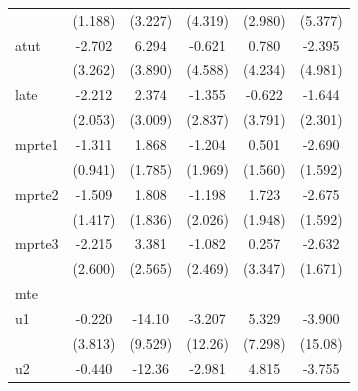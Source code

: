\begin{table}[htbp]
\begin{tabular}{l*{5}{c}}
                    &     (1.188)         &     (3.227)         &     (4.319)         &     (2.980)         &     (5.377)         \\
\addlinespace
atut                &      -2.702         &       6.294         &      -0.621         &       0.780         &      -2.395         \\
                    &     (3.262)         &     (3.890)         &     (4.588)         &     (4.234)         &     (4.981)         \\
\addlinespace
late                &      -2.212         &       2.374         &      -1.355         &      -0.622         &      -1.644         \\
                    &     (2.053)         &     (3.009)         &     (2.837)         &     (3.791)         &     (2.301)         \\
\addlinespace
mprte1              &      -1.311         &       1.868         &      -1.204         &       0.501         &      -2.690\sym{*}  \\
                    &     (0.941)         &     (1.785)         &     (1.969)         &     (1.560)         &     (1.592)         \\
\addlinespace
mprte2              &      -1.509         &       1.808         &      -1.198         &       1.723         &      -2.675\sym{*}  \\
                    &     (1.417)         &     (1.836)         &     (2.026)         &     (1.948)         &     (1.592)         \\
\addlinespace
mprte3              &      -2.215         &       3.381         &      -1.082         &       0.257         &      -2.632         \\
                    &     (2.600)         &     (2.565)         &     (2.469)         &     (3.347)         &     (1.671)         \\
\midrule
mte                 &                     &                     &                     &                     &                     \\
u1                  &      -0.220         &      -14.10         &      -3.207         &       5.329         &      -3.900         \\
                    &     (3.813)         &     (9.529)         &     (12.26)         &     (7.298)         &     (15.08)         \\
\addlinespace
u2                  &      -0.440         &      -12.36         &      -2.981         &       4.815         &      -3.755         \\

\end{tabular}
\end{table}
